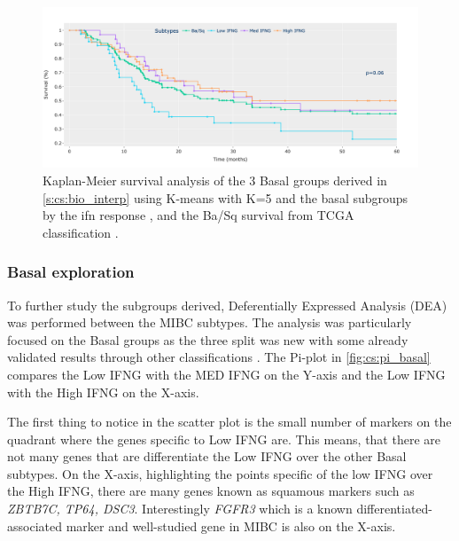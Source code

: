 \begin{figure}[!htb]    
    \centering
    \includegraphics[width=1.0\textwidth,keepaspectratio]{Sections/ClusteringAnalysis/Resources/discussion/survival_basal.png}
    \caption{Kaplan-Meier survival analysis of the 3 Basal groups derived in \cref{s:cs:bio_interp} using K-means with K=5 and the basal subgroups by the \acrshort{ifn} response \citet{Baker2022-bj}, and the Ba/Sq survival from TCGA classification \citet{Robertson2017-mg}.}
    \label{fig:cs:basal_survival}
\end{figure}

\subsubsection{Basal exploration}

To further study the subgroups derived, Deferentially Expressed Analysis (DEA) was performed between the MIBC subtypes. The analysis was particularly focused on the Basal groups as the three split was new with some already validated results through other classifications \citet{Baker2022-bj,Marzouka2018-ge}. The Pi-plot in \cref{fig:cs:pi_basal} compares the Low IFNG with the MED IFNG on the Y-axis and the Low IFNG with the High IFNG on the X-axis. 

The first thing to notice in the scatter plot is the small number of markers on the quadrant where the genes specific to Low IFNG are. This means, that there are not many genes that are differentiate the Low IFNG over the other Basal subtypes. On the X-axis, highlighting the points specific of the low IFNG over the High IFNG, there are many genes known as squamous markers such as \textit{ZBTB7C, TP64, DSC3}. Interestingly \textit{FGFR3} which is a known differentiated-associated marker and well-studied gene in MIBC is also on the X-axis. 

